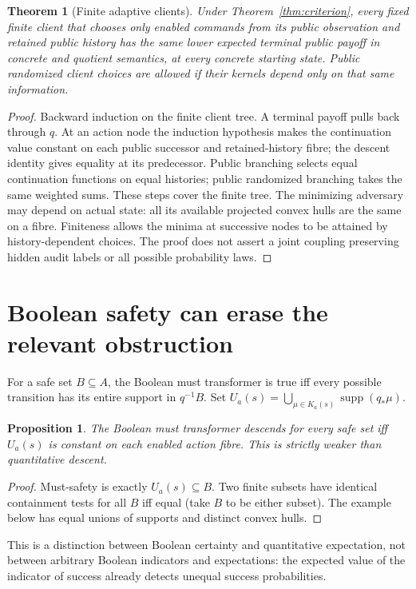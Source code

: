 \documentclass[11pt]{article}
\newtheorem{theorem}{Theorem}\newtheorem{proposition}{Proposition}
\begin{document}
\begin{theorem}[Finite adaptive clients]
Under Theorem~\ref{thm:criterion}, every fixed finite client that chooses only enabled commands from its public observation and retained public history has the same lower expected terminal public payoff in concrete and quotient semantics, at every concrete starting state. Public randomized client choices are allowed if their kernels depend only on that same information.
\end{theorem}
\begin{proof}
Backward induction on the finite client tree. A terminal payoff pulls back through $q$. At an action node the induction hypothesis makes the continuation value constant on each public successor and retained-history fibre; the descent identity gives equality at its predecessor. Public branching selects equal continuation functions on equal histories; public randomized branching takes the same weighted sums. These steps cover the finite tree. The minimizing adversary may depend on actual state: all its available projected convex hulls are the same on a fibre. Finiteness allows the minima at successive nodes to be attained by history-dependent choices. The proof does not assert a joint coupling preserving hidden audit labels or all possible probability laws.
\end{proof}

\section{Boolean safety can erase the relevant obstruction}
For a safe set $B\subseteq A$, the Boolean must transformer is true iff every possible transition has its entire support in $q^{-1}B$. Set
$U_a(s)=\bigcup_{\mu\in K_a(s)}\operatorname{supp}(q_*\mu)$.
\begin{proposition}
The Boolean must transformer descends for every safe set iff $U_a(s)$ is constant on each enabled action fibre. This is strictly weaker than quantitative descent.
\end{proposition}
\begin{proof}
Must-safety is exactly $U_a(s)\subseteq B$. Two finite subsets have identical containment tests for all $B$ iff equal (take $B$ to be either subset). The example below has equal unions of supports and distinct convex hulls.
\end{proof}
This is a distinction between Boolean certainty and quantitative expectation, not between arbitrary Boolean indicators and expectations: the expected value of the indicator of success already detects unequal success probabilities.
\end{document}
